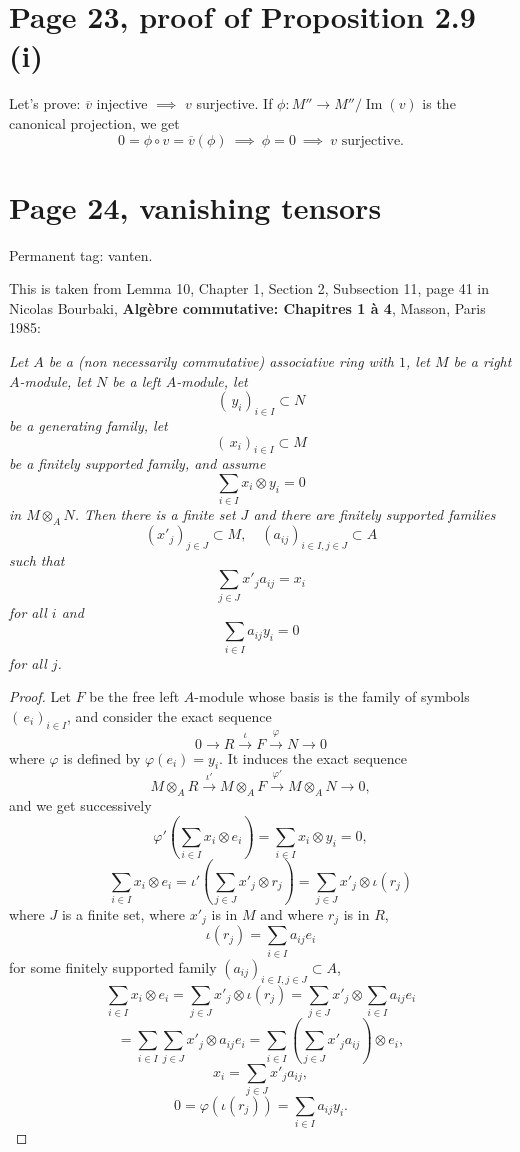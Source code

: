 \documentclass[12pt]{article}
\newcommand{\oo}{\operatorname}
\begin{document}
\section{Page 23, proof of Proposition 2.9 (i)}%

Let's prove: $\overline v$ injective $\implies$ $v$ surjective. If $\phi:M''\to M''/\oo{Im}(v)$ is the canonical projection, we get 
$$
0=\phi\circ v=\overline v(\phi)\ \implies\ \phi=0\ \implies\ v\text{ surjective.}
$$

\section{Page 24, vanishing tensors}\label{vt}%

Permanent tag: vanten.

This is taken from Lemma 10, Chapter 1, Section 2, Subsection 11, page 41 in Nicolas Bourbaki, \textbf{Algèbre commutative: Chapitres 1 à 4}, Masson, Paris 1985:

\emph{Let $A$ be a (non necessarily commutative) associative ring with $1$, let $M$ be a right $A$-module, let $N$ be a left $A$-module, let 
$$
(\,y_i)_{i\in I}\subset N
$$ 
be a generating family, let 
$$
(\,x_i)_{i\in I}\subset M
$$ 
be a finitely supported family, and assume 
$$
\sum_{i\in I}x_i\otimes y_i=0
$$ 
in $M\otimes_AN$. Then there is a finite set $J$ and there are finitely supported families 
$$
(x'_j)_{j\in J}\subset M,\quad(a_{ij})_{i\in I,j\in J}\subset A
$$ 
such that 
$$
\sum_{j\in J} x'_ja_{ij}=x_i
$$ 
for all $i$ and 
$$
\sum_{i\in I}a_{ij}y_i=0
$$ 
for all $j$.}

\begin{proof} 
Let $F$ be the free left $A$-module whose basis is the family of symbols $(\,e_i)_{i\in I}$, and consider the exact sequence 
$$
0\to R\xrightarrow\iota F\xrightarrow\varphi N\to 0
$$ 
where $\varphi$ is defined by $\varphi(e_i)=y_i$. It induces the exact sequence 
$$
M\otimes_AR\xrightarrow{\iota'}M\otimes_AF\xrightarrow{\varphi'}M\otimes_AN\to 0,
$$ 
and we get successively
$$
\varphi'\left(\sum_{i\in I}x_i\otimes e_i\right)=\sum_{i\in I}x_i\otimes y_i=0,
$$ 
$$
\sum_{i\in I}x_i\otimes e_i=\iota'\left(\sum_{j\in J}x'_j\otimes r_j\right)=\sum_{j\in J}x'_j\otimes\iota(r_j)
$$ 
where $J$ is a finite set, where $x'_j$ is in $M$ and where $r_j$ is in $R$, 
$$
\iota(r_j)=\sum_{i\in I}a_{ij}e_i
$$ 
for some finitely supported family $(a_{ij})_{i\in I,j\in J}\subset A$, 
$$
\sum_{i\in I}x_i\otimes e_i=\sum_{j\in J}x'_j\otimes\iota(r_j)=\sum_{j\in J} x'_j\otimes\sum_{i\in I}a_{ij}e_i
$$
$$
=\sum_{i\in I}\sum_{j\in J} x'_j\otimes a_{ij}e_i=\sum_{i\in I}\left(\sum_{j\in J}x'_ja_{ij}\right)\otimes e_i,
$$ 
$$
x_i=\sum_{j\in J}x'_ja_{ij},
$$ 
$$
0=\varphi(\iota(r_j))=\sum_{i\in I}a_{ij}y_i.
$$ 
\end{proof}
\end{document}
